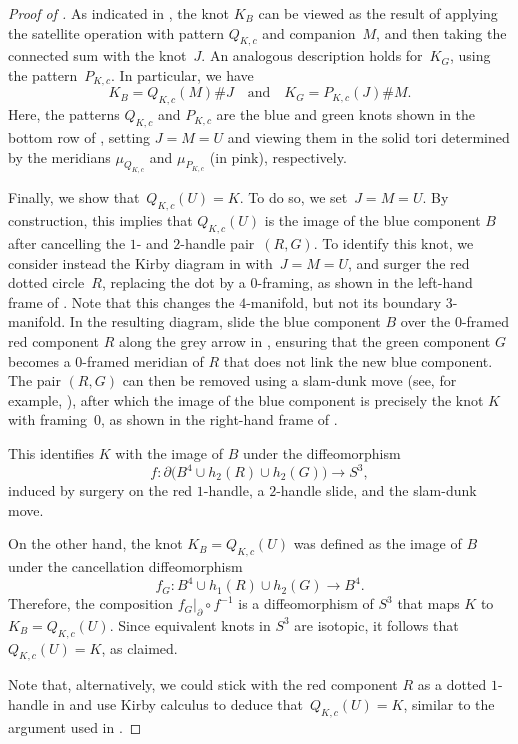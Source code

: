 \documentclass{amsart}
\theoremstyle{remark}
\begin{document}
\begin{proof}[{Proof of }]
    
    As indicated in , the knot $K_B$ can be viewed as the result of applying the satellite operation with pattern
    $Q_{K,c}$ and companion~$M$, and then taking the connected sum with the knot~$J$. An analogous description holds for~$K_G$, using the pattern~$P_{K,c}$. In particular, we have
    \begin{equation*}
        K_B = Q_{K,c}(M) \#J \quad \text{and} \quad K_G = P_{K,c}(J) \# M.
    \end{equation*}
    Here, the patterns $Q_{K,c}$ and $P_{K,c}$ are the blue and green knots shown in the bottom row of , setting $J = M =U$ and viewing them in the solid tori determined by the meridians $\mu_{Q_{K,c}}$ and $\mu_{P_{K,c}}$ (in pink), respectively.    

Finally, we show that~$Q_{K,c}(U)=K$.
To do so,
we set~$J=M=U$. By construction, this implies that $Q_{K,c}(U)$ is the image of the blue component $B$ after cancelling the $1$- and $2$-handle pair~$(R,G)$.
To identify this knot, we consider instead the Kirby diagram in  with~$J=M=U$, and surger the red dotted circle~$R$, replacing the dot by a $0$-framing, as shown in the left-hand frame of . Note that this changes the $4$-manifold, but not its boundary $3$-manifold. 
In the resulting diagram, slide the blue component $B$ over the $0$-framed red component $R$ along the grey arrow in , ensuring that the green component $G$ becomes a $0$-framed meridian of $R$ that does not link the new blue component.
The pair $(R,G)$ can then be removed using a slam-dunk move (see, for example, \cite[p.~163]{gompf-stipsicz:book}), after which
the image of the blue component is precisely the knot $K$ with framing~$0$, as shown in the right-hand frame of . 

This identifies $K$ with the image of $B$ under the diffeomorphism
$$
f\colon\partial\bigl(B^4 \cup h_2(R)\cup h_2(G)\bigr)\to S^3,
$$
induced by surgery on the red $1$-handle, a $2$-handle slide,
and the slam-dunk move.

On the other hand, the knot $K_B=Q_{K,c}(U)$ was defined as the image of $B$ under the cancellation diffeomorphism
$$
f_G \colon B^4\cup h_1(R)\cup h_2(G)\to B^4.
$$
Therefore,
the composition $f_G|_{\partial}\circ f^{-1}$ is a diffeomorphism of $S^3$ that maps $K$ to $K_B=Q_{K,c}(U)$. Since equivalent knots in $S^3$ are isotopic, it follows that $Q_{K,c}(U)=K$, as claimed.

Note that, alternatively, we could stick with the red component $R$ as a %
dotted $1$-handle in  and use Kirby calculus to deduce that~$Q_{K,c}(U)=K$,  
similar to the argument used in \cite[Proposition~2.2]{piccirillo:Conway}.
\end{proof}
\end{document}
